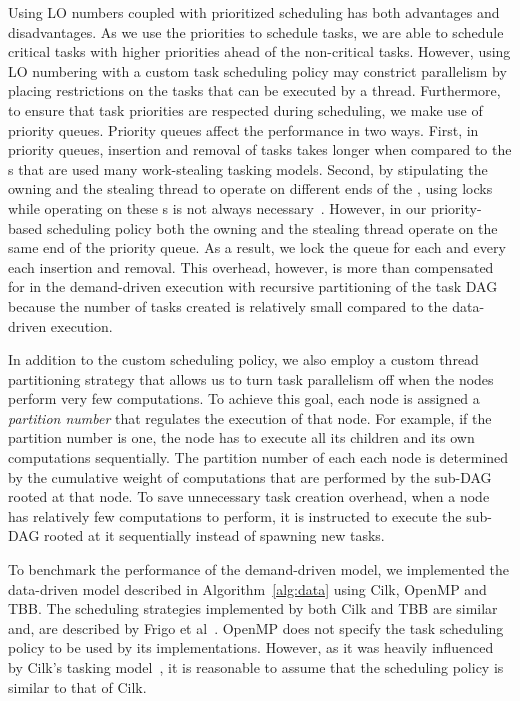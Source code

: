 \documentclass[10pt,conference]{IEEEtran}
\begin{document}
%
Using LO numbers coupled with prioritized scheduling has both advantages and
disadvantages. As we use the priorities to schedule tasks, we are able to
schedule critical tasks with higher priorities ahead of the non-critical tasks. 
%
However, using LO numbering with a custom task scheduling policy may constrict
parallelism by placing restrictions on the tasks that can be executed by a
thread.
%
Furthermore, to ensure that task priorities are respected during scheduling, we
make use of priority queues. Priority queues affect the performance in two
ways. First, in priority queues, insertion and removal of tasks takes longer
when compared to the s that are used many work-stealing tasking
models.  Second, by stipulating the owning and the stealing thread to operate
on different ends of the , using locks while operating on these
s is not always necessary~\cite{FrigoLeRa98}. However, in our
priority-based scheduling policy both the owning and the stealing thread
operate on the same end of the priority queue.  As a result, we lock the queue
for each and every each insertion and removal. This overhead, however,
is more than compensated for in the demand-driven execution with
recursive partitioning of the task DAG because the number of tasks 
created is relatively small compared to the data-driven execution.

In addition to the custom scheduling policy, we also employ a custom thread
partitioning strategy that allows us to turn task parallelism off when the
nodes perform very few computations. To achieve this goal, each node is
assigned a \textit{partition number} that regulates the execution of that node.
For example, if the partition number is one, the node has to execute all its
children and its own computations sequentially. The partition number of each
each node is determined by the cumulative weight of computations that are
performed by the sub-DAG rooted at that node. To save unnecessary task
creation overhead, when a node has relatively few computations to perform, it
is instructed to execute the sub-DAG rooted at it sequentially instead of
spawning new tasks.

To benchmark the performance of the demand-driven model, we implemented the
data-driven model described in Algorithm~\ref{alg:data} using Cilk, OpenMP and
TBB.  The scheduling strategies implemented by both Cilk and TBB are similar
and, are described by Frigo et al~\cite{FrigoLeRa98}. OpenMP does not specify
the task scheduling policy to be used by its implementations.  However, as it
was heavily influenced by Cilk's tasking model~\cite{OmpTask}, it is reasonable
to assume that the scheduling policy is similar to that of Cilk.
\end{document}
